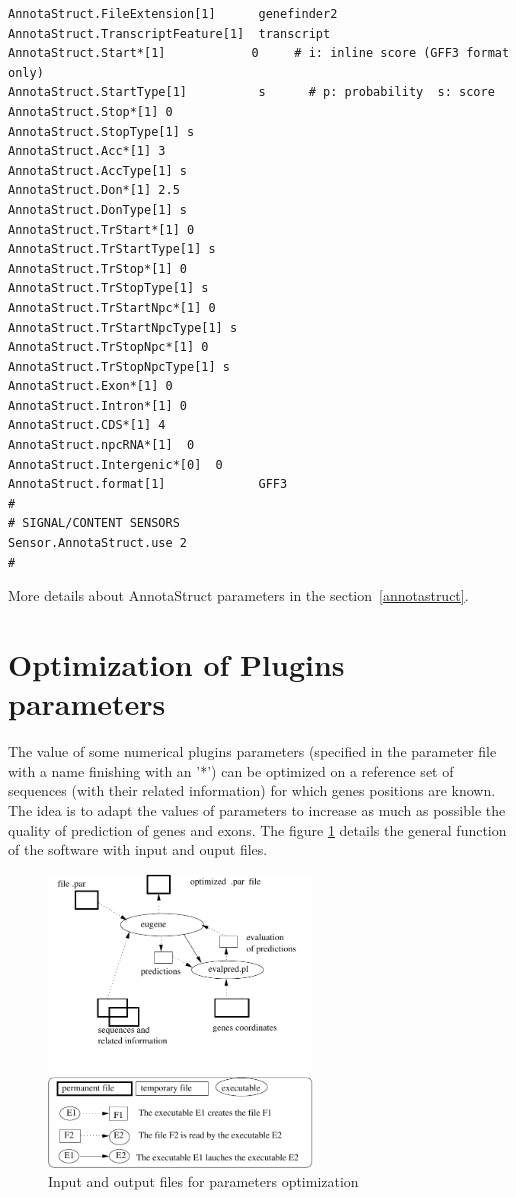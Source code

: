\documentclass[a4paper,titlepage]{report}
\begin{document}
\begin{Verbatim}[fontsize=\small]
AnnotaStruct.FileExtension[1]      genefinder2
AnnotaStruct.TranscriptFeature[1]  transcript
AnnotaStruct.Start*[1]            0     # i: inline score (GFF3 format only)
AnnotaStruct.StartType[1]          s      # p: probability  s: score
AnnotaStruct.Stop*[1] 0
AnnotaStruct.StopType[1] s
AnnotaStruct.Acc*[1] 3
AnnotaStruct.AccType[1] s
AnnotaStruct.Don*[1] 2.5
AnnotaStruct.DonType[1] s
AnnotaStruct.TrStart*[1] 0
AnnotaStruct.TrStartType[1] s
AnnotaStruct.TrStop*[1] 0
AnnotaStruct.TrStopType[1] s
AnnotaStruct.TrStartNpc*[1] 0
AnnotaStruct.TrStartNpcType[1] s
AnnotaStruct.TrStopNpc*[1] 0
AnnotaStruct.TrStopNpcType[1] s
AnnotaStruct.Exon*[1] 0
AnnotaStruct.Intron*[1] 0
AnnotaStruct.CDS*[1] 4
AnnotaStruct.npcRNA*[1]  0
AnnotaStruct.Intergenic*[0]  0
AnnotaStruct.format[1]             GFF3
#
# SIGNAL/CONTENT SENSORS
Sensor.AnnotaStruct.use 2
#
\end{Verbatim}
More details about AnnotaStruct parameters in the section~\ref{annotastruct}.



\section{Optimization of Plugins parameters}

The value of some numerical plugins parameters (specified in the
parameter file with a name finishing with an '*') can be optimized on
a reference set of sequences (with their related information) for
which genes positions are known. The idea is to adapt the values of
parameters to increase as much as possible the quality of prediction
of genes and exons. The figure \ref{fig:ParaOptimization} details the
general function of the software with input and ouput files.

\begin{figure}[htbp]
  \begin{center}
    \includegraphics[width=7cm]{ParaOptimization}
  \end{center}
  \caption{Input and output files for parameters optimization} 
  \label{fig:ParaOptimization}
\end{figure}
\end{document}

